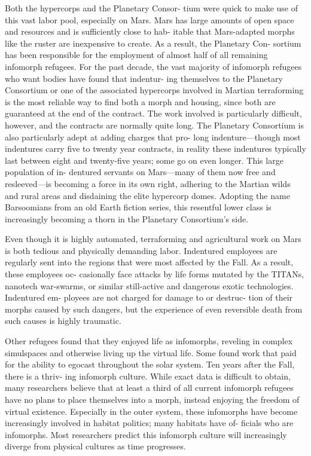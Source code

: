 Both the hypercorps and the Planetary Consor-
tium were quick to make use of this vast labor pool, 
especially on Mars. Mars has large amounts of open 
space and resources and is sufficiently close to hab-
itable that Mars-adapted morphs like the ruster are 
inexpensive to create. As a result, the Planetary Con-
sortium has been responsible for the employment of 
almost half of all remaining infomorph refugees. 
For the past decade, the vast majority of infomorph 
refugees who want bodies have found that indentur-
ing themselves to the Planetary Consortium or one 
of the associated hypercorps involved in Martian 
terraforming is the most reliable way to find both 
a morph and housing, since both are guaranteed 
at the end of the contract. The work involved is 
particularly difficult, however, and the contracts are 
normally quite long. The Planetary Consortium is 
also particularly adept at adding charges that pro-
long indenture—though most indentures carry five 
to twenty year contracts, in reality these indentures 
typically last between eight and twenty-five years; 
some go on even longer. This large population of in-
dentured servants on Mars—many of them now free 
and resleeved—is becoming a force in its own right, 
adhering to the Martian wilds and rural areas and 
disdaining the elite hypercorp domes. Adopting the 
name Barsoomians from an old Earth fiction series, 
this resentful lower class is increasingly becoming a 
thorn in the Planetary Consortium's side.

Even though it is highly automated, terraforming 
and agricultural work on Mars is both tedious and 
physically demanding labor. Indentured employees 
are regularly sent into the regions that were most 
affected by the Fall. As a result, these employees oc-
casionally face attacks by life forms mutated by the 
TITANs, nanotech war-swarms, or similar still-active 
and dangerous exotic technologies. Indentured em-
ployees are not charged for damage to or destruc-
tion of their morphs caused by such dangers, but the 
experience of even reversible death from such causes 
is highly traumatic.

Other refugees found that they enjoyed life as 
infomorphs, reveling in complex simulspaces and 
otherwise living up the virtual life. Some found work 
that paid for the ability to egocast throughout the 
solar system. Ten years after the Fall, there is a thriv-
ing infomorph culture. While exact data is difficult to 
obtain, many researchers believe that at least a third 
of all current infomorph refugees have no plans to 
place themselves into a morph, instead enjoying the 
freedom of virtual existence. Especially in the outer 
system, these infomorphs have become increasingly 
involved in habitat politics; many habitats have of-
ficials who are infomorphs. Most researchers predict 
this infomorph culture will increasingly diverge from 
physical cultures as time progresses.

